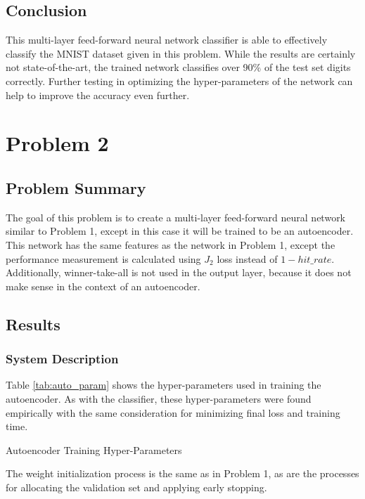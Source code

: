 \documentclass[a4paper, 12pt, titlepage]{article}
\newcommand{\tabRef}[1]{Table \ref{#1}}
\begin{document}
  \subsection{Conclusion}
  \par This multi-layer feed-forward neural network classifier is able to
  effectively classify the MNIST dataset given in this problem.
  While the results are certainly not state-of-the-art, the trained network
  classifies over 90\% of the test set digits correctly.
  Further testing in optimizing the hyper-parameters of the network can help to
  improve the accuracy even further.

  \pagebreak
  \section{Problem 2}
  \subsection{Problem Summary}
  \par The goal of this problem is to create a multi-layer feed-forward neural
  network similar to Problem 1, except in this case it will be trained to be an
  autoencoder.
  This network has the same features as the network in Problem 1, except the
  performance measurement is calculated using $J_{2}$ loss instead of
  $1 - hit\_rate$.
  Additionally, winner-take-all is not used in the output layer, because it
  does not make sense in the context of an autoencoder.

  \subsection{Results}
  \subsubsection{System Description}
  \par \tabRef{tab:auto_param} shows the hyper-parameters used in training
  the autoencoder.
  As with the classifier, these hyper-parameters were found empirically with
  the same consideration for minimizing final loss and training time.
  \begin{table}[htb]
    \centering
    \caption{Autoencoder Training Hyper-Parameters}
    \vspace{-12pt}
    \label{tab:auto_param}
    \vspace{-12pt}
  \end{table}
  \par The weight initialization process is the same as in Problem 1, as are
  the processes for allocating the validation set and applying early stopping.
\end{document}
